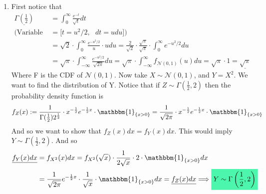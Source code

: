 \documentclass[../main.tex]{subfiles}
\begin{document}
\begin{enumerate}
\item First notice that
\begin{align*}
    \underline{\Gamma\left(\frac{1}{2}\right)} &= \int_0^\infty \frac{e^{-t}}{\sqrt{t}} dt \\
    (\text{Variable Change }&=\textbf{[}t= u^2/2, \text{    }dt=u du\textbf{]}) \\
    &= \sqrt{2}\cdot \int_0^\infty \frac{e^{-u^2/2}}{u}\cdot udu =
    \frac{2}{\sqrt{2}}\cdot\frac{\sqrt{\pi}}{\sqrt{\pi}}\cdot\int_0^\infty e^{-u^2/2}du \\ &= \sqrt{\pi}\cdot \int_{-\infty}^{\infty} \frac{e^{-u^2/2}}{\sqrt{2\pi}}du = \sqrt{\pi}\cdot\int_{-\infty}^{\infty}f_{\mathcal{N}(0,1)}(u) du = \sqrt{\pi}\cdot 1 = \underline{\sqrt{\pi}}
\end{align*}
Where F is the CDF of $\mathcal{N}(0,1)$. Now take $X\sim\mathcal{N}(0,1)$, and $Y=X^2$. We want to find the distribution of Y. Notice that if $Z\sim\Gamma(\frac{1}{2}, 2)$ then the probability density function is
\[f_Z(x):= \frac{1}{\Gamma(\frac{1}{2}) 2^{\frac{1}{2}}}\cdot x^{-\frac{1}{2}}e^{-\frac{1}{2} x}\cdot \mathbbm{1}_{\{x>0\}} = \frac{1}{\sqrt{2\pi}}\cdot x^{-\frac{1}{2}}e^{-\frac{1}{2} x}\cdot \mathbbm{1}_{\{x>0\}}\]
And so we want to show that $f_Z(x)dx = f_Y(x)dx$. This would imply $Y\sim\Gamma\left(\frac{1}{2},2\right)$. And so
\begin{align*}\underline{f_Y(x)dx} &= f_{X^2}(x)dx = f_{X^2}(\sqrt{x})\cdot \frac{1}{2\sqrt{x}}\cdot 2\cdot\mathbbm{1}_{\{x>0\}}dx\\&= \frac{1}{\sqrt{2\pi}}e^{-\frac{1}{2}x}\cdot \frac{1}{\sqrt{x}} \cdot\mathbbm{1}_{\{x>0\}}dx= \underline{f_Z(x) dx}\Longrightarrow \mathcolorbox{goodcolor}{Y\sim\Gamma\left(\frac{1}{2}, 2\right)}\end{align*}
\qedsymbol
\end{enumerate}
\noindent\makebox[\linewidth]{\rule{\linewidth}{2pt}}
\end{document}
